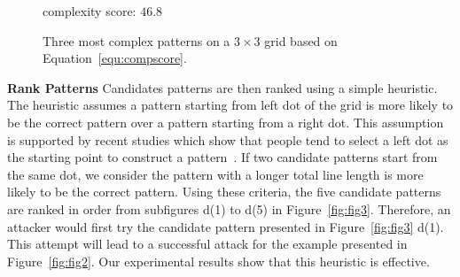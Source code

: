 \begin{figure}[!t]
{\begin{minipage}[b]{0.12\textwidth}
                \centering \footnotesize complexity score: $46.8$
                \end{minipage}
            }
            \vspace{-2mm}
            \caption{Three most complex patterns on a $3\times 3$ grid based on Equation~\ref{equ:compscore}.}
            \vspace{-2mm}
            \label{fig:most complex patterns}
        \end{figure}


        \noindent \textbf{Rank Patterns} Candidates patterns are then ranked using a simple
        heuristic. The heuristic assumes a pattern starting from
        left dot of the grid is more likely to be the correct pattern over a
         pattern starting from a right dot. This assumption is supported
        by recent studies which show that people tend to select a left dot as the starting point
        to construct a pattern~\cite{uellenbeck2013quantifying,alpnorway}.
         If two candidate patterns
         start from the same dot, we consider the pattern with a
        longer total line length
        is more likely to be the correct pattern. Using these criteria,
        the five candidate patterns are ranked in order from subfigures d(1) to d(5) in
        Figure~\ref{fig:fig3}. Therefore, an attacker would first try the candidate
        pattern presented in Figure~\ref{fig:fig3} d(1).  This attempt will lead to a
        successful attack for the example presented in Figure~\ref{fig:fig2}. Our experimental results show that
        this heuristic is effective.


